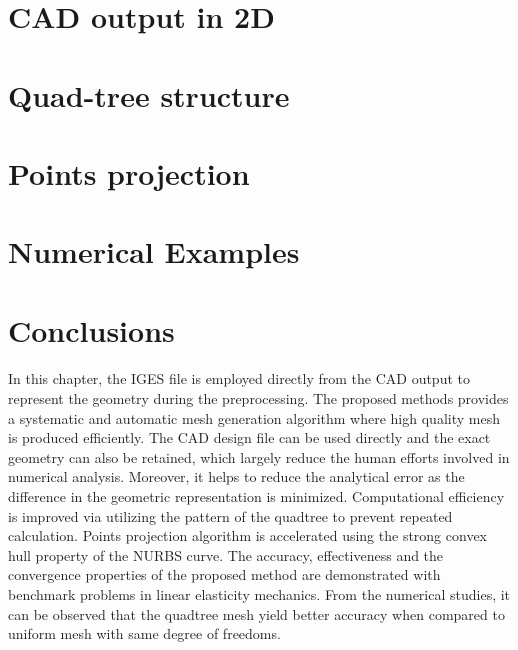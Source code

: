 \section{CAD output in 2D}
\label{qt_sc:iges}


\section{Quad-tree structure}
\label{qt_sc:quadtree}


\section{Points projection}
\label{qt_sc:projection}



\section{Numerical Examples}



% 



\section{Conclusions}
\paragraph{}
In this chapter, the IGES file is employed directly from the CAD output to represent the geometry during the preprocessing.
The proposed methods provides a systematic and automatic mesh generation algorithm where high quality mesh is produced efficiently.
The CAD design file can be used directly and the exact geometry can also be retained, which largely reduce the human efforts involved in numerical analysis.
Moreover, it helps to reduce the analytical error as the difference in the geometric representation is minimized.
Computational efficiency is improved via utilizing the pattern of the quadtree to prevent repeated calculation.
Points projection algorithm is accelerated using the strong convex hull property of the NURBS curve.
The accuracy, effectiveness and the convergence properties of the proposed method are demonstrated with benchmark problems in linear elasticity mechanics.
From the numerical studies, it can be observed that the quadtree mesh yield better accuracy when compared to uniform mesh with same degree of freedoms.
